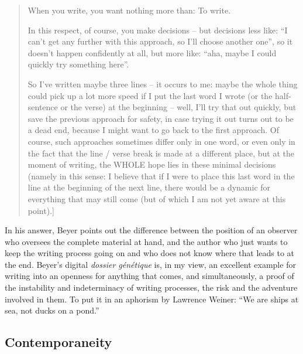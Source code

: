 \documentclass{article}
\begin{document}
\begin{quote}
When you write, you want nothing more than: To write. 

In this respect, of course, you make decisions -- but decisions less
like: ``I can't get any further with this approach, so I'll choose
another one'', so it doesn't happen confidently at all, but more like:
``aha, maybe I could quickly try something here''.

So I've written maybe three lines -- it occurs to me: maybe the whole
thing could pick up a lot more speed if I put the last word I wrote (or
the half-sentence or the verse) at the beginning -- well, I'll try that
out quickly, but save the previous approach for safety, in case trying
it out turns out to be a dead end, because I might want to go back to
the first approach. Of course, such approaches sometimes differ only in
one word, or even only in the fact that the line / verse break is made
at a different place, but at the moment of writing, the WHOLE hope lies
in these minimal decisions (namely in this sense: I believe that if I
were to place this last word in the line at the beginning of the next
line, there would be a dynamic for everything that may still come (but
of which I am not yet aware at this point).]

\begin{flushright}
    \parencite{beyer_e-mail_2016}
\end{flushright} 

\end{quote}

In his answer, Beyer points out the difference between the position of
an observer who oversees the complete material at hand, and the author
who just wants to keep the writing process going on and who does not
know where that leads to at the end. Beyer's digital \emph{dossier
génétique} is, in my view, an excellent example for writing into an
openness for anything that comes, and simultaneously, a proof of the
instability and indeterminacy of writing processes, the risk and the
adventure involved in them. To put it in an aphorism by Lawrence Weiner:
``We are ships at sea, not ducks on a pond.''

\subsection*{Contemporaneity}
\end{document}
